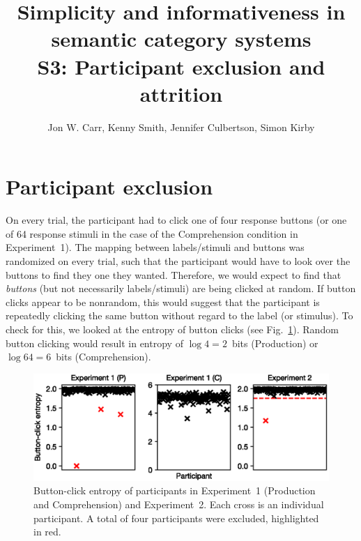 \documentclass[a4paper, 11pt]{article}
\title{Simplicity and informativeness in semantic category systems \\ S3: Participant exclusion and attrition}
\author{Jon W. Carr, Kenny Smith, Jennifer Culbertson, Simon Kirby}
\date{}
\begin{document}
\maketitle

\section{Participant exclusion}

On every trial, the participant had to click one of four response buttons (or one of 64 response stimuli in the case of the Comprehension condition in Experiment~1). The mapping between labels/stimuli and buttons was randomized on every trial, such that the participant would have to look over the buttons to find they one they wanted. Therefore, we would expect to find that \textit{buttons} (but not necessarily labels/stimuli) are being clicked at random. If button clicks appear to be nonrandom, this would suggest that the participant is repeatedly clicking the same button without regard to the label (or stimulus). To check for this, we looked at the entropy of button clicks (see Fig.~\ref{fg_exclusion}). Random button clicking would result in entropy of $\log 4 = 2$~bits (Production) or $\log 64 = 6$~bits (Comprehension).

	\begin{figure}
	\begin{center}
	\includegraphics[]{exclusion.eps}
	\caption{Button-click entropy of participants in Experiment~1 (Production and Comprehension) and Experiment~2. Each cross is an individual participant. A total of four participants were excluded, highlighted in red.}
	\label{fg_exclusion}
	\end{center}
	\end{figure}
\end{document}
